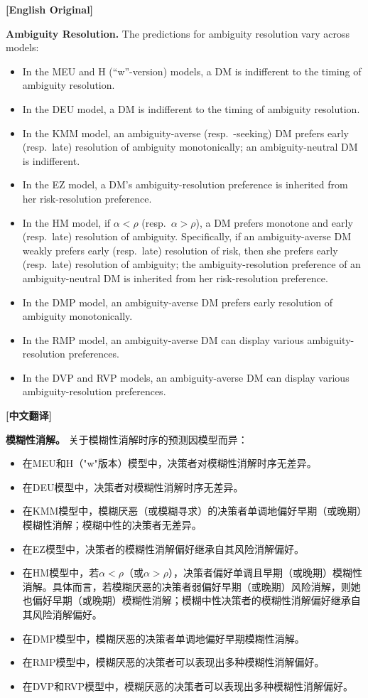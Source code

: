 \documentclass[12pt,a4paper]{ctexart}
\newenvironment{original}{%
  \par\medskip\noindent\textbf{[English Original]}\par\smallskip
  \color{black}\small
}{%
  \par\medskip
}
\newenvironment{translation}{%
  \par\noindent\textbf{[中文翻译]}\par\smallskip
  \color{blue}\small
}{%
  \par\bigskip
}
\theoremstyle{definition}
\theoremstyle{remark}
\begin{document}
\begin{original}
\textbf{Ambiguity Resolution.} The predictions for ambiguity resolution vary across models:
\begin{itemize}
  \item In the MEU and H (``w''-version) models, a DM is indifferent to the timing of ambiguity resolution.
  \item In the DEU model, a DM is indifferent to the timing of ambiguity resolution.
  \item In the KMM model, an ambiguity-averse (resp.\ -seeking) DM prefers early (resp.\ late) resolution of ambiguity monotonically; an ambiguity-neutral DM is indifferent.
  \item In the EZ model, a DM's ambiguity-resolution preference is inherited from her risk-resolution preference.
  \item In the HM model, if $\alpha < \rho$ (resp.\ $\alpha > \rho$), a DM prefers monotone and early (resp.\ late) resolution of ambiguity. Specifically, if an ambiguity-averse DM weakly prefers early (resp.\ late) resolution of risk, then she prefers early (resp.\ late) resolution of ambiguity; the ambiguity-resolution preference of an ambiguity-neutral DM is inherited from her risk-resolution preference.
  \item In the DMP model, an ambiguity-averse DM prefers early resolution of ambiguity monotonically.
  \item In the RMP model, an ambiguity-averse DM can display various ambiguity-resolution preferences.
  \item In the DVP and RVP models, an ambiguity-averse DM can display various ambiguity-resolution preferences.
\end{itemize}
\end{original}
\begin{translation}
\textbf{模糊性消解。} 关于模糊性消解时序的预测因模型而异：
\begin{itemize}
  \item 在MEU和H（"w"版本）模型中，决策者对模糊性消解时序无差异。
  \item 在DEU模型中，决策者对模糊性消解时序无差异。
  \item 在KMM模型中，模糊厌恶（或模糊寻求）的决策者单调地偏好早期（或晚期）模糊性消解；模糊中性的决策者无差异。
  \item 在EZ模型中，决策者的模糊性消解偏好继承自其风险消解偏好。
  \item 在HM模型中，若$\alpha < \rho$（或$\alpha > \rho$），决策者偏好单调且早期（或晚期）模糊性消解。具体而言，若模糊厌恶的决策者弱偏好早期（或晚期）风险消解，则她也偏好早期（或晚期）模糊性消解；模糊中性决策者的模糊性消解偏好继承自其风险消解偏好。
  \item 在DMP模型中，模糊厌恶的决策者单调地偏好早期模糊性消解。
  \item 在RMP模型中，模糊厌恶的决策者可以表现出多种模糊性消解偏好。
  \item 在DVP和RVP模型中，模糊厌恶的决策者可以表现出多种模糊性消解偏好。
\end{itemize}
\end{translation}
\end{document}

